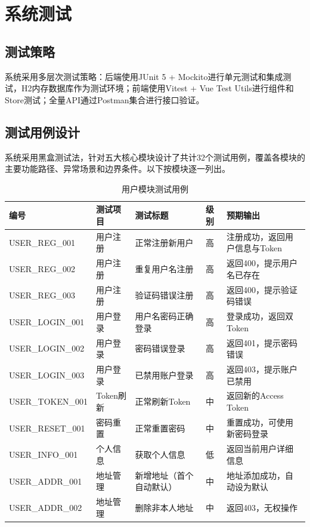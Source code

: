 \documentclass[12pt,a4paper,oneside]{ctexart}
\begin{document}
\FloatBarrier
\section{系统测试}

\subsection{测试策略}

系统采用多层次测试策略：后端使用JUnit 5 + Mockito进行单元测试和集成测试，H2内存数据库作为测试环境；前端使用Vitest + Vue Test Utils进行组件和Store测试；全量API通过Postman集合进行接口验证。

\subsection{测试用例设计}

系统采用黑盒测试法，针对五大核心模块设计了共计32个测试用例，覆盖各模块的主要功能路径、异常场景和边界条件。以下按模块逐一列出。

\begin{table}[htbp]
\centering
\caption{用户模块测试用例}
\label{tab:test-user}
\renewcommand{\arraystretch}{1.1}
\scriptsize
\setlength{\tabcolsep}{3pt}
\begin{tabular}{|p{3.1cm}|p{1.0cm}|p{2.2cm}|p{0.6cm}|p{7.5cm}|}
\hline
\textbf{编号} & \textbf{测试项目} & \textbf{测试标题} & \textbf{级别} & \textbf{预期输出} \\
\hline
USER\_REG\_001 & 用户注册 & 正常注册新用户 & 高 & 注册成功，返回用户信息与Token \\
\hline
USER\_REG\_002 & 用户注册 & 重复用户名注册 & 高 & 返回400，提示用户名已存在 \\
\hline
USER\_REG\_003 & 用户注册 & 验证码错误注册 & 高 & 返回400，提示验证码错误 \\
\hline
USER\_LOGIN\_001 & 用户登录 & 用户名密码正确登录 & 高 & 登录成功，返回双Token \\
\hline
USER\_LOGIN\_002 & 用户登录 & 密码错误登录 & 高 & 返回401，提示密码错误 \\
\hline
USER\_LOGIN\_003 & 用户登录 & 已禁用账户登录 & 高 & 返回403，提示账户已禁用 \\
\hline
USER\_TOKEN\_001 & Token刷新 & 正常刷新Token & 中 & 返回新的Access Token \\
\hline
USER\_RESET\_001 & 密码重置 & 正常重置密码 & 中 & 重置成功，可使用新密码登录 \\
\hline
USER\_INFO\_001 & 个人信息 & 获取个人信息 & 低 & 返回当前用户详细信息 \\
\hline
USER\_ADDR\_001 & 地址管理 & 新增地址（首个自动默认） & 中 & 地址添加成功，自动设为默认 \\
\hline
USER\_ADDR\_002 & 地址管理 & 删除非本人地址 & 中 & 返回403，无权操作 \\
\hline
\hline
\end{tabular}
\end{table}
\end{document}
